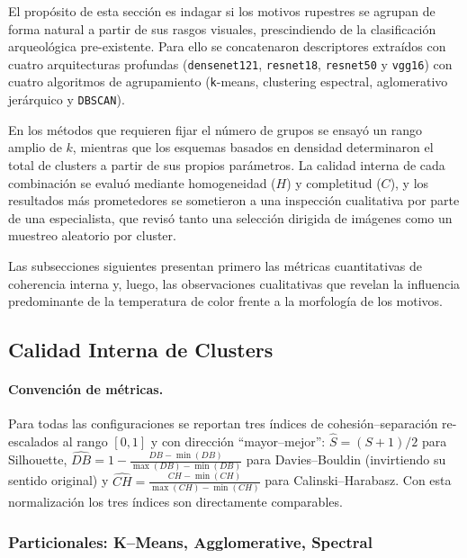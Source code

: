 El propósito de esta sección es indagar si los motivos rupestres se agrupan de forma natural a partir de sus rasgos visuales, prescindiendo de la clasificación arqueológica pre-existente.
Para ello se concatenaron descriptores extraídos con cuatro arquitecturas profundas (\texttt{densenet121}, \texttt{resnet18}, \texttt{resnet50} y \texttt{vgg16}) con cuatro algoritmos de agrupamiento (\texttt{k}-means, clustering espectral, aglomerativo jerárquico y \texttt{DBSCAN}).

En los métodos que requieren fijar el número de grupos se ensayó un rango amplio de $k$, mientras que los esquemas basados en densidad determinaron el total de clusters a partir de sus propios parámetros.
La calidad interna de cada combinación se evaluó mediante homogeneidad ($H$) y completitud ($C$), y los resultados más prometedores se sometieron a una inspección cualitativa por parte de una especialista, que revisó tanto una selección dirigida de imágenes como un muestreo aleatorio por cluster.

Las subsecciones siguientes presentan primero las métricas cuantitativas de coherencia interna y, luego, las observaciones cualitativas que revelan la influencia predominante de la temperatura de color frente a la morfología de los motivos.

\subsection{Calidad Interna de Clusters}

\paragraph{Convención de métricas.}
Para todas las configuraciones se reportan tres índices de cohesión–separación
re-escalados al rango \([0,1]\) y con dirección “mayor–mejor”:
\(\widehat S=(S+1)/2\) para Silhouette,
\(\widehat{DB}=1-\frac{DB-\min(DB)}{\max(DB)-\min(DB)}\) para Davies–Bouldin
(invirtiendo su sentido original) y
\(\widehat{CH}=\frac{CH-\min(CH)}{\max(CH)-\min(CH)}\) para Calinski–Harabasz.
Con esta normalización los tres índices son directamente comparables.

\subsubsection{Particionales: K–Means, Agglomerative, Spectral}

